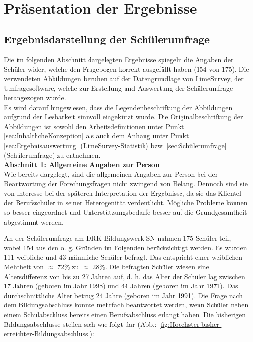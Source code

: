 \section{Präsentation der Ergebnisse}
\label{sec:PräsentationDerErgebnisse}

\subsection{Ergebnisdarstellung der Schülerumfrage}
\label{sec:ErgebnisdarstellungDerSchülerumfrage}

Die im folgenden Abschnitt dargelegten Ergebnisse spiegeln die Angaben der Schüler wider, welche den Fragebogen korrekt ausgefüllt haben (154 von 175). Die verwendeten Abbildungen beruhen auf der Datengrundlage von LimeSurvey, der Umfragesoftware, welche zur Erstellung und Auswertung der Schülerumfrage herangezogen wurde.\\

\noindent
Es wird darauf hingewiesen, dass die Legendenbeschriftung der Abbildungen aufgrund der Lesbarkeit sinnvoll eingekürzt wurde. Die Originalbeschriftung der Abbildungen ist sowohl den Arbeitsdefinitionen unter Punkt \ref{sec:InhaltlicheKonzeption} als auch dem Anhang unter Punkt \ref{sec:Ergebnisauswertung} (LimeSurvey-Statistik) bzw. \ref{sec:Schülerumfrage} (Schülerumfrage) zu entnehmen.\\

\noindent
\textbf{Abschnitt 1: Allgemeine Angaben zur Person}\\

\noindent
Wie bereits dargelegt, sind die allgemeinen Angaben zur Person bei der Beantwortung der Forschungsfragen nicht zwingend von Belang. Dennoch sind sie von Interesse bei der späteren Interpretation der Ergebnisse, da sie das Klientel der Berufsschüler in seiner Heterogenität verdeutlicht. Mögliche Probleme können so besser eingeordnet und Unterstützungsbedarfe besser auf die Grundgesamtheit abgestimmt werden.

An der Schülerumfrage am DRK Bildungswerk SN nahmen 175 Schüler teil, wobei 154 aus den o. g. Gründen im Folgenden berücksichtigt werden. Es wurden 111 weibliche und 43 männliche Schüler befragt. Das entspricht einer weiblichen Mehrheit von $\approx$ 72\% zu $\approx$ 28\%. Die befragten Schüler wiesen eine Altersdifferenz von bis zu 27 Jahren auf, d. h. das Alter der Schüler lag zwischen 17 Jahren (geboren im Jahr 1998) und 44 Jahren (geboren im Jahr 1971). Das durchschnittliche Alter betrug 24 Jahre (geboren im Jahr 1991). Die Frage nach dem Bildungsabschluss konnte mehrfach beantwortet werden, wenn Schüler neben einem Schulabschluss bereits einen Berufsabschluss erlangt haben. Die bisherigen Bildungsabschlüsse stellen sich wie folgt dar (Abb.: \ref{fig:Hoechster-bisher-erreichter-Bildungsabschluss}):

